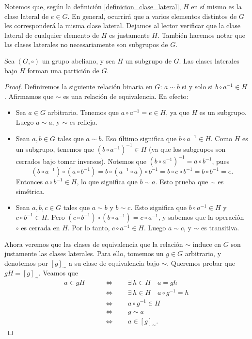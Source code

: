 Notemos que, según la definición \ref{definicion_clase_lateral}, $H$ en sí mismo es la clase lateral de $e \in G$. En general, ocurrirá que a varios elementos distintos de $G$ les corresponderá la misma clase lateral. Dejamos al lector verificar que la clase lateral de cualquier elemento de $H$ es justamente $H$. También hacemos notar que las clases laterales no necesariamente son subgrupos de $G$.

\begin{prop} \label{lema:rel bin}
Sea $(G, \circ)$ un grupo abeliano, y sea $H$ un subgrupo de $G$. Las clases laterales bajo $H$ forman una partición de $G$.
\end{prop}

\begin{proof}
Definiremos la siguiente relación binaria en $G$: $a \sim b$ si y solo si $b \circ a^{-1} \in H$. Afirmamos que $\sim$ es una relación de equivalencia. En efecto:
\begin{itemize}
\item Sea $a \in G$ arbitrario. Tenemos que $a \circ a^{-1} = e \in H$, ya que $H$ es un subgrupo. Luego $a \sim a$, y $\sim$ es refleja.
\item Sean $a, b \in G$ tales que $a \sim b$. Eso último significa que $b \circ a^{-1} \in H$. Como $H$ es un subgrupo, tenemos que $\left( b \circ a^{-1} \right)^{-1} \in H$ (ya que los subgrupos son cerrados bajo tomar inversos). Notemos que $\left( b \circ a^{-1} \right)^{-1} = a \circ b^{-1}$, pues
$$\left( b \circ a^{-1} \right) \circ \left(a \circ b^{-1} \right) = b \circ \left( a^{-1} \circ a \right) \circ b^{-1} = b \circ e \circ b^{-1} = b \circ b^{-1} = e.$$
Entonces $a \circ b^{-1} \in H$, lo que significa que $b \sim a$. Esto prueba que $\sim$ es simétrica.
\item Sean $a, b, c \in G$ tales que $a \sim b$ y $b \sim c$. Esto significa que $b \circ a^{-1} \in H$ y $c \circ b^{-1} \in H$. Pero $(c \circ b^{-1}) \circ (b \circ a^{-1}) = c \circ a^{-1}$, y sabemos que la operación
$\circ$ es cerrada en $H$. Por lo tanto, $c \circ a^{-1} \in H$. Luego
$a\sim c$, y $\sim$ es transitiva.
\end{itemize}
Ahora veremos que las clases de equivalencia que la relación $\sim$ induce en $G$ son justamente las clases laterales. Para ello, tomemos un $g \in G$ arbitrario, y denotemos por $\left[ g \right]_{\sim}$ a su clase de equivalencia bajo $\sim$. Queremos probar que $gH = \left[ g \right]_\sim$. Veamos que
\begin{align*}
a \in gH \qquad & \Leftrightarrow \qquad \exists\, h \in H \quad a = gh \\
& \Leftrightarrow \qquad \exists\, h \in H \quad a \circ g^{-1} = h \\
& \Leftrightarrow \qquad a \circ g^{-1} \in H \\
& \Leftrightarrow \qquad g \sim a \\
& \Leftrightarrow \qquad a \in  \left[ g \right]_\sim.
\end{align*}
\end{proof}



